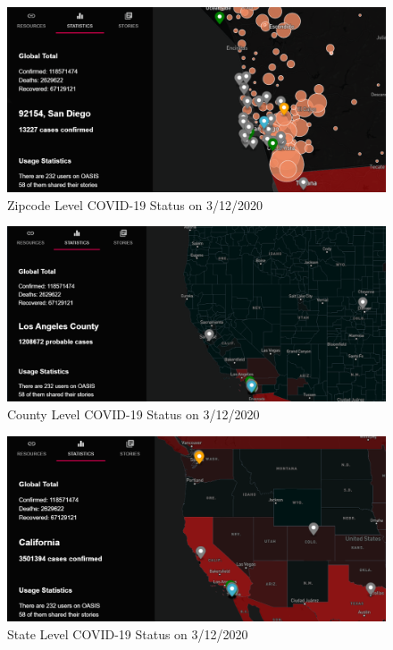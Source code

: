 \documentclass{ucsdreport}
\begin{document}
\begin{figure}[H]
    \centering
    \includegraphics[scale=0.45]{images/zipcode.png}
    \caption{Zipcode Level COVID-19 Status on 3/12/2020}
\end{figure}
\begin{figure}[H]
    \centering
    \includegraphics[scale=0.43]{images/county.png}
    \caption{County Level COVID-19 Status on 3/12/2020}
\end{figure}
\begin{figure}[H]
    \centering
    \includegraphics[scale=0.5]{images/state.png}
    \caption{State Level COVID-19 Status on 3/12/2020}
\end{figure}
\end{document}
